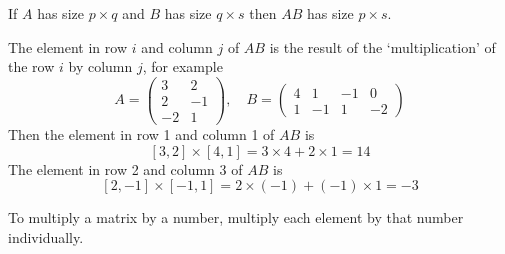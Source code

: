 If $A$ has size $p \times q$ and $B$ has size $q \times s$ then $AB$ has size $p \times s$. 

The element in row $i$ and column $j$ of $AB$ is the result of the `multiplication' of the row $i$ by column $j$, for example
\[
A= 
\begin{pmatrix}
    3 & 2\\
    2 & -1\\
    -2 & 1
\end{pmatrix}
,\quad
B= 
\begin{pmatrix}
    4 & 1 & -1 & 0\\
    1 & -1 & 1 & -2
\end{pmatrix}
\]
Then the element in row 1 and column 1 of $AB$ is
\[ [3,2] \times [4,1] = 3 \times 4 + 2 \times 1 = 14 \]
The element in row 2 and column 3 of $AB$ is
\[ [2, -1] \times [-1, 1] = 2 \times (-1) + (-1) \times 1 = -3 \]

To multiply a matrix by a number, multiply each element by that number individually.